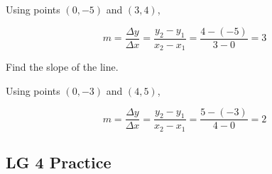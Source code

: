 \documentclass[]{exam}
\begin{document}
\begin{questions}

\begin{solution}
Using points $(0,-5)$ and $(3,4)$,

\begin{equation*}
    m = \frac{\Delta y}{\Delta x} = \frac{y_2 - y_1}{x_2 - x_1} = \frac{4-(-5)}{3-0} = \boxed{3}
\end{equation*}
\end{solution}

\question Find the slope of the line.


\begin{solution}
Using points $(0,-3)$ and $(4,5)$,

\begin{equation*}
    m = \frac{\Delta y}{\Delta x} = \frac{y_2 - y_1}{x_2 - x_1} = \frac{5-(-3)}{4-0} = \boxed{2}
\end{equation*}
\end{solution}

\end{questions}

\clearpage

\subsection*{LG 4 Practice}
\end{document}
